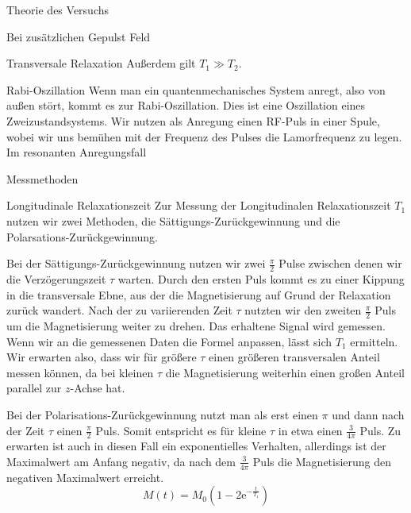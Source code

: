 \documentclass[pdftex, a4paper,11pt, twoside, ngerman]{report}
\begin{document}
\begin{chapter}{Theorie des Versuchs}
\begin{section}{Bei zusätzlichen Gepulst Feld}
\begin{subsection}{Transversale Relaxation}
            Außerdem gilt $T_1 \gg T_2$.
        \end{subsection}

        \begin{subsection}{Rabi-Oszillation}
            Wenn man ein quantenmechanisches System anregt, also von außen stört, kommt es zur Rabi-Oszillation.
            Dies ist eine Oszillation eines Zweizustandsystems.
            Wir nutzen als Anregung einen RF-Puls in einer Spule, wobei wir uns bemühen mit der Frequenz des Pulses die Lamorfrequenz zu legen.
            Im resonanten Anregungsfall 

        \end{subsection}
    \end{section}

    \begin{section}{Messmethoden}
        \begin{subsection}{Longitudinale Relaxationszeit}
            Zur Messung der Longitudinalen Relaxationszeit $T_1$ nutzen wir zwei Methoden, die Sättigungs-Zurückgewinnung und die Polarsations-Zurückgewinnung.

            Bei der Sättigungs-Zurückgewinnung nutzen wir zwei $\frac \pi 2$ Pulse zwischen denen wir die Verzögerungszeit $\tau$ warten.
            Durch den ersten Puls kommt es zu einer Kippung in die transversale Ebne, aus der die Magnetisierung auf Grund der Relaxation zurück wandert. 
            Nach der zu variierenden Zeit $\tau$ nutzten wir den zweiten $\frac \pi 2$ Puls um die Magnetisierung weiter zu drehen.
            Das erhaltene Signal wird gemessen.
            Wenn wir an die gemessenen Daten die Formel 
            anpassen, lässt sich $T_1$ ermitteln.
            Wir erwarten also, dass wir für größere $\tau$ einen größeren transversalen Anteil messen können, da bei kleinen $\tau$ die Magnetisierung weiterhin einen großen Anteil parallel zur $z$-Achse hat.

            Bei der Polarisations-Zurückgewinnung nutzt man als erst einen $\pi$ und dann nach der Zeit $\tau$ einen $\frac \pi 2$ Puls. 
            Somit entspricht es für kleine $\tau$ in etwa einen $\frac 3{4\pi}$ Puls.
            Zu erwarten ist auch in diesen Fall ein exponentielles Verhalten, allerdings ist der Maximalwert am Anfang negativ, da nach dem $\frac 3{4\pi}$ Puls die Magnetisierung den negativen Maximalwert erreicht.
            \[
                M(t) = M_0\left( 1-2\mathrm e^{-\frac t{T_1}}\right)
            \]


\end{subsection}
\end{section}
\end{chapter}
\end{document}
